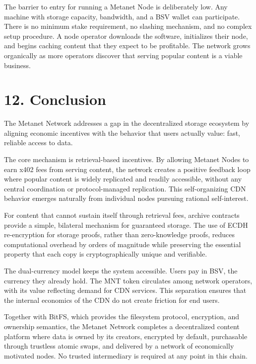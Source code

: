 \documentclass[11pt,a4paper]{article}
\begin{document}
The barrier to entry for running a Metanet Node is deliberately low. Any machine with storage capacity, bandwidth, and a BSV wallet can participate. There is no minimum stake requirement, no slashing mechanism, and no complex setup procedure. A node operator downloads the software, initializes their node, and begins caching content that they expect to be profitable. The network grows organically as more operators discover that serving popular content is a viable business.

\section{12. Conclusion}

The Metanet Network addresses a gap in the decentralized storage ecosystem by aligning economic incentives with the behavior that users actually value: fast, reliable access to data.

The core mechanism is retrieval-based incentives. By allowing Metanet Nodes to earn x402 fees from serving content, the network creates a positive feedback loop where popular content is widely replicated and readily accessible, without any central coordination or protocol-managed replication. This self-organizing CDN behavior emerges naturally from individual nodes pursuing rational self-interest.

For content that cannot sustain itself through retrieval fees, archive contracts provide a simple, bilateral mechanism for guaranteed storage. The use of ECDH re-encryption for storage proofs, rather than zero-knowledge proofs, reduces computational overhead by orders of magnitude while preserving the essential property that each copy is cryptographically unique and verifiable.

The dual-currency model keeps the system accessible. Users pay in BSV, the currency they already hold. The MNT token circulates among network operators, with its value reflecting demand for CDN services. This separation ensures that the internal economics of the CDN do not create friction for end users.

Together with BitFS, which provides the filesystem protocol, encryption, and ownership semantics, the Metanet Network completes a decentralized content platform where data is owned by its creators, encrypted by default, purchasable through trustless atomic swaps, and delivered by a network of economically motivated nodes. No trusted intermediary is required at any point in this chain.
\end{document}
